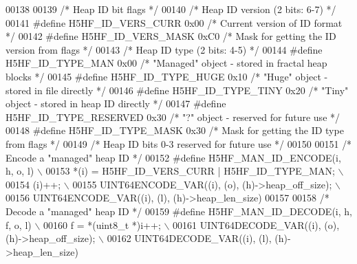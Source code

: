 \begin{DoxyCode}
00138 
00139 \textcolor{comment}{/* Heap ID bit flags */}
00140 \textcolor{comment}{/* Heap ID version (2 bits: 6-7) */}
00141 \textcolor{preprocessor}{#define H5HF\_ID\_VERS\_CURR       0x00    }\textcolor{comment}{/* Current version of ID format */}\textcolor{preprocessor}{}
00142 \textcolor{preprocessor}{#define H5HF\_ID\_VERS\_MASK       0xC0    }\textcolor{comment}{/* Mask for getting the ID version from flags */}\textcolor{preprocessor}{}
00143 \textcolor{comment}{/* Heap ID type (2 bits: 4-5) */}
00144 \textcolor{preprocessor}{#define H5HF\_ID\_TYPE\_MAN        0x00    }\textcolor{comment}{/* "Managed" object - stored in fractal heap blocks */}\textcolor{preprocessor}{}
00145 \textcolor{preprocessor}{#define H5HF\_ID\_TYPE\_HUGE       0x10    }\textcolor{comment}{/* "Huge" object - stored in file directly */}\textcolor{preprocessor}{}
00146 \textcolor{preprocessor}{#define H5HF\_ID\_TYPE\_TINY       0x20    }\textcolor{comment}{/* "Tiny" object - stored in heap ID directly */}\textcolor{preprocessor}{}
00147 \textcolor{preprocessor}{#define H5HF\_ID\_TYPE\_RESERVED   0x30    }\textcolor{comment}{/* "?" object - reserved for future use */}\textcolor{preprocessor}{}
00148 \textcolor{preprocessor}{#define H5HF\_ID\_TYPE\_MASK       0x30    }\textcolor{comment}{/* Mask for getting the ID type from flags */}\textcolor{preprocessor}{}
00149 \textcolor{comment}{/* Heap ID bits 0-3 reserved for future use */}
00150 
00151 \textcolor{comment}{/* Encode a "managed" heap ID */}
00152 \textcolor{preprocessor}{#define H5HF\_MAN\_ID\_ENCODE(i, h, o, l)                                        \(\backslash\)}
00153 \textcolor{preprocessor}{    *(i) = H5HF\_ID\_VERS\_CURR | H5HF\_ID\_TYPE\_MAN;                              \(\backslash\)}
00154 \textcolor{preprocessor}{    (i)++;                                                                    \(\backslash\)}
00155 \textcolor{preprocessor}{    UINT64ENCODE\_VAR((i), (o), (h)->heap\_off\_size);                           \(\backslash\)}
00156 \textcolor{preprocessor}{    UINT64ENCODE\_VAR((i), (l), (h)->heap\_len\_size)}
00157 
00158 \textcolor{comment}{/* Decode a "managed" heap ID */}
00159 \textcolor{preprocessor}{#define H5HF\_MAN\_ID\_DECODE(i, h, f, o, l)                                     \(\backslash\)}
00160 \textcolor{preprocessor}{    f = *(uint8\_t *)i++;                                                      \(\backslash\)}
00161 \textcolor{preprocessor}{    UINT64DECODE\_VAR((i), (o), (h)->heap\_off\_size);                           \(\backslash\)}
00162 \textcolor{preprocessor}{    UINT64DECODE\_VAR((i), (l), (h)->heap\_len\_size)}

\end{DoxyCode}
